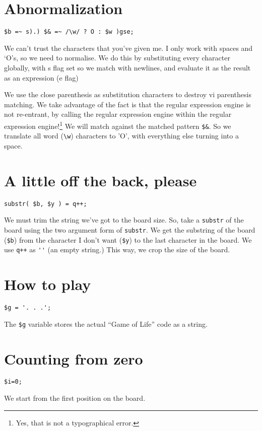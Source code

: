 \documentclass{article}
\begin{document}
\section{Abnormalization}
\begin{verbatim}
$b =~ s).) $& =~ /\w/ ? O : $w )gse;
\end{verbatim}

We can't trust the characters that you've given me.  I only work with
spaces and `O's, so we need to normalise.  We do this by substituting
every character globally, with s flag set so we match with newlines, and
evaluate it as the result as an expression (e flag)

We use the close parenthesis as substitution characters to destroy vi
parenthesis matching.  We take advantage of the fact is that the regular
expression engine is not re-entrant, by calling the regular expression
engine within the regular expression engine!\footnote{Yes, that is not a
typographical error.}  We will match against the
matched pattern \verb"$&".  So we translate all word (\verb"\w") characters
to 'O', with everything else turning into a space.

\section{A little off the back, please} 
\begin{verbatim}
substr( $b, $y ) = q++;
\end{verbatim}
We must trim the string we've
got to the board size.  So, take a \verb"substr" of the board using the two
argument form of \verb"substr".  We get the substring of the board
(\verb"$b") from the character I
don't want (\verb"$y") to the last character in the board.  
We use \verb"q++" as \verb"''" (an empty string.)  This way, we crop the 
size of the board.

\section{How to play}
\begin{verbatim}
$g = '. . .';
\end{verbatim}
The \verb"$g" variable stores the actual ``Game of Life'' code as a string.

\section{Counting from zero}
\begin{verbatim}
$i=0;
\end{verbatim}
We start from the first position on the board.
\end{document}
